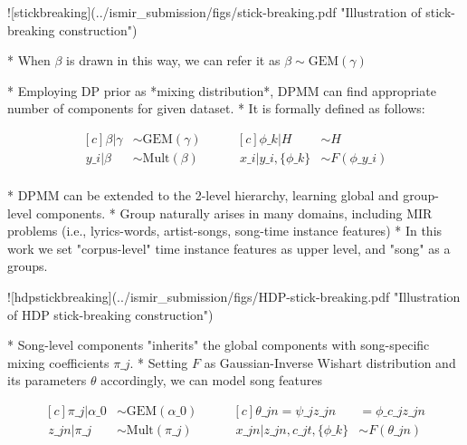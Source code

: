 \documentclass{beamer}
\begin{document}
\begin{frame}[fragile]
\begin{columns}[T]
\begin{column}{.46\textwidth}
\begin{markdown}
![stickbreaking](../ismir_submission/figs/stick-breaking.pdf "Illustration of stick-breaking construction")

* When $\beta$ is drawn in this way, we can refer it as $\beta \sim \text{GEM}(\gamma)$

* Employing DP prior as *mixing distribution*, DPMM can find appropriate number of components for given dataset.
* It is formally defined as follows:

\begin{equation}
\begin{aligned}[c]
    \beta|\gamma &\sim \text{GEM}(\gamma) \\\
    y\_{i}|\beta &\sim \text{Mult}(\beta) \\\
\end{aligned}
\qquad
\begin{aligned}[c]
    \phi\_{k}|H &\sim H \\\
    x\_{i}|y\_{i},\{\phi\_{k}\} &\sim F(\phi\_{y\_{i}}) \\\
\end{aligned}
\end{equation}


* DPMM can be extended to the 2-level hierarchy, learning global and group-level components.
* Group naturally arises in many domains, including MIR problems (i.e., lyrics-words, artist-songs, song-time instance features)
* In this work we set "corpus-level" time instance features as upper level, and "song" as a groups.

\setkeys{Gin}{width=.7\linewidth}
![hdpstickbreaking](../ismir_submission/figs/HDP-stick-breaking.pdf "Illustration of HDP stick-breaking construction")

* Song-level components "inherits" the global components with song-specific mixing coefficients $\pi\_{j}$.
* Setting $F$ as Gaussian-Inverse Wishart distribution and its parameters $\theta$ accordingly, we can model song features 

\begin{equation}
\begin{aligned}[c]
    \pi\_{j}|\alpha\_{0} &\sim \text{GEM}(\alpha\_{0}) \\\
    z\_{jn}|\pi\_{j} &\sim \text{Mult}(\pi\_{j})
\end{aligned}
\qquad
\begin{aligned}[c]
    \theta\_{jn} = \psi\_{jz\_{jn}} &= \phi\_{c\_{jz\_{jn}}}  \\\
    x\_{jn}|z\_{jn}, c\_{jt}, \{\phi\_{k}\} &\sim F(\theta\_{jn}) 
\end{aligned}
\end{equation}


\end{markdown}
\end{column}
\end{columns}
\end{frame}
\end{document}
